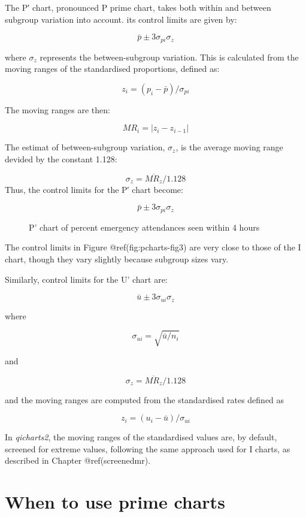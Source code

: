 \documentclass[
]{book}
\makeatletter
\newcommand*\pandocbounded[1]{%
  \sbox\pandoc@box{#1}%
  \Gscale@div\@tempa{\textheight}{\dimexpr\ht\pandoc@box+\dp\pandoc@box\relax}%
  \Gscale@div\@tempb{\linewidth}{\wd\pandoc@box}%
  \ifdim\@tempb\p@<\@tempa\p@\let\@tempa\@tempb\fi%
  \ifdim\@tempa\p@<\p@\scalebox{\@tempa}{\usebox\pandoc@box}%
  \else\usebox{\pandoc@box}%
  \fi%
}
\makeatother
\begin{document}
The P′ chart, pronounced P prime chart, takes both within and between
subgroup variation into account. its control limits are given by:

\[\bar{p}\pm3\sigma_{pi}\sigma_z\]

where \(\sigma_z\) represents the between-subgroup variation. This is
calculated from the moving ranges of the standardised proportions,
defined as:

\[z_i=(p_i - \bar{p})/\sigma_{pi}\]

The moving ranges are then:

\[MR_i=|z_i-z_{i-1}|\]

The estimat of between-subgroup variation, \(\sigma_z\), is the average
moving range devided by the constant 1.128:

\[\sigma_z=\overline{MR_z}/1.128\] Thus, the control limits for the P′
chart become:

\[\bar{p}\pm3\sigma_{pi}\sigma_z \]

\begin{figure}
\centering
\pandocbounded{}
\caption{P' chart of percent emergency attendances seen within 4 hours}
\end{figure}

The control limits in Figure @ref(fig:pcharts-fig3) are very close to
those of the I chart, though they vary slightly because subgroup sizes
vary.

Similarly, control limits for the U' chart are:

\[\bar{u}\pm3\sigma_{ui}\sigma_z\]

where

\[\sigma_{ui}=\sqrt{\bar{u}/n_i}\]

and

\[\sigma_{z}=\overline{MR_z}/1.128\]

and the moving ranges are computed from the standardised rates defined
as

\[z_i=(u_i-\bar{u})/\sigma_{ui}\]

In \emph{qicharts2}, the moving ranges of the standardised values are,
by default, screened for extreme values, following the same approach
used for I charts, as described in Chapter @ref(screenedmr).

\section{When to use prime charts}\label{when-to-use-prime-charts}
\end{document}
